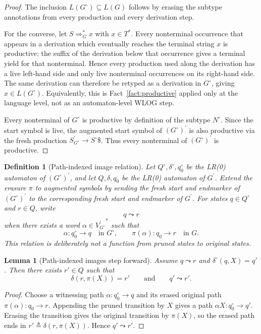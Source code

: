 \documentclass[11pt,a4paper]{article}
\theoremstyle{prettyplain}
\newtheorem{lemma}[theorem]{Lemma}
\theoremstyle{prettydef}
\newtheorem{definition}[theorem]{Definition}
\newcommand{\Path}[3]{#1:#2\to#3}
\begin{document}
\begin{proof}
The inclusion \(L(G^\circ)\subseteq L(G)\) follows by erasing the subtype
annotations from every production and every derivation step.

For the converse, let \(S\Rightarrow_G^* x\) with \(x\in T^*\).  Every
nonterminal occurrence that appears in a derivation which eventually reaches the
terminal string \(x\) is productive: the suffix of the derivation below that
occurrence gives a terminal yield for that nonterminal.  Hence every production
used along the derivation has a live left-hand side and only live nonterminal
occurrences on its right-hand side.  The same derivation can therefore be retyped
as a derivation in \(G^\circ\), giving \(x\in L(G^\circ)\).  Equivalently, this is
Fact~\ref{fact:productive} applied only at the language level, not as an
automaton-level WLOG step.

Every nonterminal of \(G^\circ\) is productive by definition of the subtype
\(N^\circ\).  Since the start symbol is live, the augmented start symbol of
\((G^\circ)^\prime\) is also productive via the fresh production
\(S_{G^\circ}^\prime\to S^\circ\$\).  Thus every nonterminal of
\((G^\circ)^\prime\) is productive.
\end{proof}

\begin{definition}[Path-indexed image relation]
\label{def:path-indexed-image}
Let \(Q^\circ,\delta^\circ,q_0^\circ\) be the LR(0) automaton of
\((G^\circ)^\prime\), and let \(Q,\delta,q_0\) be the LR(0) automaton of
\(G^\prime\).  Extend the erasure \(\pi\) to augmented symbols by sending the
fresh start and endmarker of \((G^\circ)^\prime\) to the corresponding fresh
start and endmarker of \(G^\prime\).  For states \(q\in Q^\circ\) and \(r\in Q\),
write
\[
q\leadsto r
\]
when there exists a word \(\alpha\in {V_{G^\circ}^{\prime}}^{*}\) such that
\[
\Path{\alpha}{q_0^\circ}{q}
\quad\text{in }G^\circ,
\qquad
\Path{\pi(\alpha)}{q_0}{r}
\quad\text{in }G.
\]
This relation is deliberately not a function from pruned states to original
states.
\end{definition}

\begin{lemma}[Path-indexed images step forward]
\label{lem:path-image-step}
Assume \(q\leadsto r\) and \(\delta^\circ(q,X)=q'\).  Then there exists
\(r'\in Q\) such that
\[
\delta(r,\pi(X))=r'
\qquad\text{and}\qquad
q'\leadsto r'.
\]
\end{lemma}

\begin{proof}
Choose a witnessing path \(\Path{\alpha}{q_0^\circ}{q}\) and its erased original
path \(\Path{\pi(\alpha)}{q_0}{r}\).  Appending the pruned transition by \(X\)
gives a path \(\Path{\alpha X}{q_0^\circ}{q'}\).  Erasing the transition gives
the original transition by \(\pi(X)\), so the erased path ends in
\(r'\triangleq\delta(r,\pi(X))\).  Hence \(q'\leadsto r'\).
\end{proof}
\end{document}

